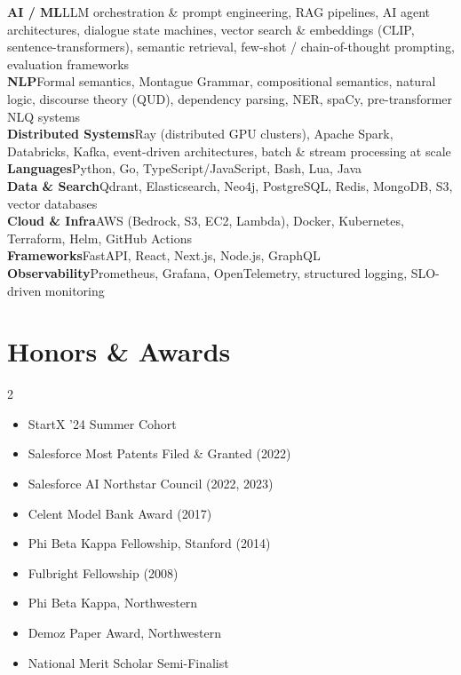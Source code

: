 \documentclass[9pt,letterpaper]{extarticle}
\begin{document}
\noindent\textbf{\color{navy}AI / ML}\enspace LLM orchestration \& prompt engineering, RAG pipelines, AI agent architectures, dialogue state machines, vector search \& embeddings (CLIP, sentence-transformers), semantic retrieval, few-shot / chain-of-thought prompting, evaluation frameworks\\[0.15em]
\noindent\textbf{\color{navy}NLP}\enspace Formal semantics, Montague Grammar, compositional semantics, natural logic, discourse theory (QUD), dependency parsing, NER, spaCy, pre-transformer NLQ systems\\[0.15em]
\noindent\textbf{\color{navy}Distributed Systems}\enspace Ray (distributed GPU clusters), Apache Spark, Databricks, Kafka, event-driven architectures, batch \& stream processing at scale\\[0.15em]
\noindent\textbf{\color{navy}Languages}\enspace Python, Go, TypeScript/JavaScript, Bash, Lua, Java\\[0.15em]
\noindent\textbf{\color{navy}Data \& Search}\enspace Qdrant, Elasticsearch, Neo4j, PostgreSQL, Redis, MongoDB, S3, vector databases\\[0.15em]
\noindent\textbf{\color{navy}Cloud \& Infra}\enspace AWS (Bedrock, S3, EC2, Lambda), Docker, Kubernetes, Terraform, Helm, GitHub Actions\\[0.15em]
\noindent\textbf{\color{navy}Frameworks}\enspace FastAPI, React, Next.js, Node.js, GraphQL\\[0.15em]
\noindent\textbf{\color{navy}Observability}\enspace Prometheus, Grafana, OpenTelemetry, structured logging, SLO-driven monitoring

\section{Honors \& Awards}

\begin{multicols}{2}
\begin{itemize}
  \item StartX '24 Summer Cohort
  \item Salesforce Most Patents Filed \& Granted (2022)
  \item Salesforce AI Northstar Council (2022, 2023)
  \item Celent Model Bank Award (2017)
  \item Phi Beta Kappa Fellowship, Stanford (2014)
  \item Fulbright Fellowship (2008)
  \item Phi Beta Kappa, Northwestern
  \item Demoz Paper Award, Northwestern
  \item National Merit Scholar Semi-Finalist
\end{itemize}
\end{multicols}
\end{document}

